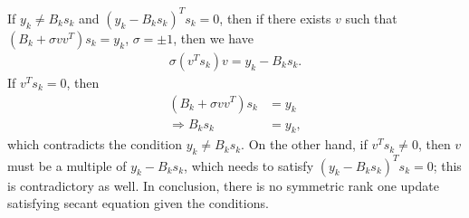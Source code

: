 \documentclass[11pt]{article}
\begin{document}
\subsection{}
If $y_k \neq B_ks_k$ and $(y_k-B_ks_k)^Ts_k=0$, then if there exists $v$ such that $(B_k+\sigma vv^T)s_k = y_k$, $\sigma=\pm1$, then we have
\begin{equation}\begin{split} 
\sigma(v^Ts_k)v = y_k-B_ks_k.
\end{split}\nonumber\end{equation} 
If $v^Ts_k=0$, then
\begin{equation}\begin{split}
(B_k+\sigma vv^T)s_k &= y_k \\
\Rightarrow B_ks_k &= y_k,
\end{split}\nonumber\end{equation} 
which contradicts the condition $y_k \neq B_ks_k$. On the other hand, if $v^Ts_k\neq0$, then $v$ must be a multiple of $y_k-B_ks_k$, which needs to satisfy $(y_k-B_ks_k)^Ts_k=0$; this is contradictory as well. In conclusion, there is no symmetric rank one update satisfying secant equation given the conditions.
\end{document}
